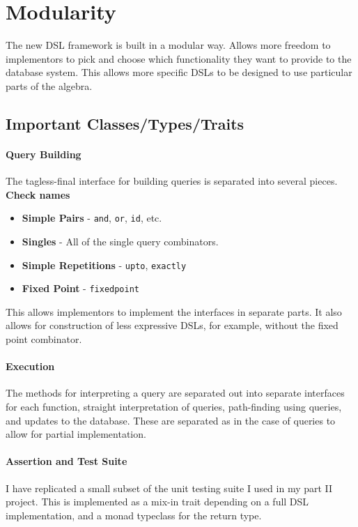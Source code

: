 \documentclass{report}
\newcommand \2[0]{\textbf{2}}
\newcommand \3[0]{\textbf{3}}
\newcommand{\todo}[1]{\textbf{#1}}
\begin{document}
\section{Modularity}
The new DSL framework is built in a modular way. 
Allows more freedom to implementors to pick and choose which functionality they want to provide to the database system. This allows more specific DSLs to be designed to use particular parts of the algebra.
\subsection{Important Classes/Types/Traits}
\paragraph{Query Building}
The tagless-final interface for building queries is separated into several pieces.
\todo{Check names}
\begin{itemize}
    \item \textbf{Simple Pairs} - \texttt{and}, \texttt{or}, \texttt{id}, etc.
    \item \textbf{Singles} - All of the single query combinators.
    \item \textbf{Simple Repetitions} - \texttt{upto}, \texttt{exactly}
    \item \textbf{Fixed Point} - \texttt{fixedpoint}
\end{itemize}

This allows implementors to implement the interfaces in separate parts. It also allows for construction of less expressive DSLs, for example, without the fixed point combinator.

\paragraph{Execution}
The methods for interpreting a query are separated out into separate interfaces for each function, straight interpretation of queries, path-finding using queries, and updates to the database. These are separated as in the case of queries to allow for partial implementation.

\paragraph{Assertion and Test Suite}
I have replicated a small subset of the unit testing suite I used in my part II project. This is implemented as a mix-in trait depending on a full DSL implementation, and a monad typeclass for the return type.
\end{document}
